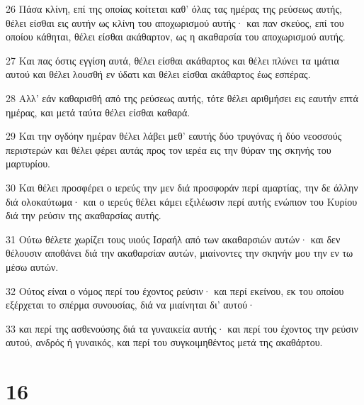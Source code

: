 \par 26 Πάσα κλίνη, επί της οποίας κοίτεται καθ' όλας τας ημέρας της ρεύσεως αυτής, θέλει είσθαι εις αυτήν ως κλίνη του αποχωρισμού αυτής· και παν σκεύος, επί του οποίου κάθηται, θέλει είσθαι ακάθαρτον, ως η ακαθαρσία του αποχωρισμού αυτής.
\par 27 Και πας όστις εγγίση αυτά, θέλει είσθαι ακάθαρτος και θέλει πλύνει τα ιμάτια αυτού και θέλει λουσθή εν ύδατι και θέλει είσθαι ακάθαρτος έως εσπέρας.
\par 28 Αλλ' εάν καθαρισθή από της ρεύσεως αυτής, τότε θέλει αριθμήσει εις εαυτήν επτά ημέρας, και μετά ταύτα θέλει είσθαι καθαρά.
\par 29 Και την ογδόην ημέραν θέλει λάβει μεθ' εαυτής δύο τρυγόνας ή δύο νεοσσούς περιστερών και θέλει φέρει αυτάς προς τον ιερέα εις την θύραν της σκηνής του μαρτυρίου.
\par 30 Και θέλει προσφέρει ο ιερεύς την μεν διά προσφοράν περί αμαρτίας, την δε άλλην διά ολοκαύτωμα· και ο ιερεύς θέλει κάμει εξιλέωσιν περί αυτής ενώπιον του Κυρίου διά την ρεύσιν της ακαθαρσίας αυτής.
\par 31 Ούτω θέλετε χωρίζει τους υιούς Ισραήλ από των ακαθαρσιών αυτών· και δεν θέλουσιν αποθάνει διά την ακαθαρσίαν αυτών, μιαίνοντες την σκηνήν μου την εν τω μέσω αυτών.
\par 32 Ούτος είναι ο νόμος περί του έχοντος ρεύσιν· και περί εκείνου, εκ του οποίου εξέρχεται το σπέρμα συνουσίας, διά να μιαίνηται δι' αυτού·
\par 33 και περί της ασθενούσης διά τα γυναικεία αυτής· και περί του έχοντος την ρεύσιν αυτού, ανδρός ή γυναικός, και περί του συγκοιμηθέντος μετά της ακαθάρτου.

\chapter{16}


